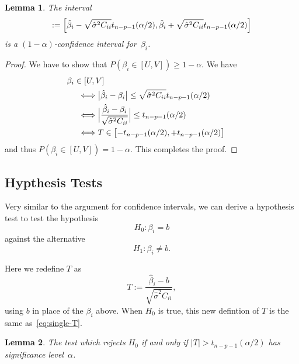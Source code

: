 \documentclass[
  a4paper,
]{article}
\newtheorem{lemma}{Lemma}[section]
\theoremstyle{definition}
\theoremstyle{definition}
\theoremstyle{definition}
\theoremstyle{definition}
\theoremstyle{remark}
\begin{document}
\begin{lemma}
\protect\hypertarget{lem:single-CI}{}\label{lem:single-CI}The interval
\begin{equation*}
  [U, V]
  := \Bigl[ \hat\beta_i - \sqrt{\hat\sigma^2 C_{ii}}t_{n-p-1}(\alpha/2), \hat\beta_i + \sqrt{\hat\sigma^2 C_{ii}}t_{n-p-1}(\alpha/2) \Bigr]
\end{equation*}
is a \((1-\alpha)\)-confidence interval for~\(\beta_i\).
\end{lemma}

\begin{proof}
We have to show that \(P(\beta_i \in [U, V]) \geq 1-\alpha\). We have
\begin{align*}
  &\hskip-5mm \beta_i \in [U, V] \\
  &\Longleftrightarrow
    \bigl| \hat\beta_i - \beta_i \bigr|
        \leq \sqrt{\hat\sigma^2 C_{ii}}t_{n-p-1}(\alpha/2) \\
  &\Longleftrightarrow
    \Bigl| \frac{\hat\beta_i - \beta_i}{\sqrt{\hat\sigma^2 C_{ii}}} \Bigr|
        \leq t_{n-p-1}(\alpha/2) \\
  &\Longleftrightarrow
    T \in \bigl[-t_{n-p-1}(\alpha/2), +t_{n-p-1}(\alpha/2)\bigr]
\end{align*}
and thus \(P(\beta_i \in [U, V]) = 1 - \alpha\). This completes the proof.
\end{proof}

\hypertarget{hypthesis-tests}{%
\subsection{Hypthesis Tests}\label{hypthesis-tests}}

Very similar to the argument for confidence intervals, we can
derive a hypothesis test to test the hypothesis
\begin{equation*}
  H_0\colon \beta_i = b
\end{equation*}
against the alternative
\begin{equation*}
  H_1\colon \beta_i \neq b.
\end{equation*}

Here we redefine \(T\) as
\begin{equation}
  T
  := \frac{\hat\beta_i - b}{\sqrt{\hat\sigma^2 C_{ii}}},  \label{eq:single-test}
\end{equation}
using \(b\) in place of the \(\beta_i\) above. When \(H_0\) is true, this new
defintion of \(T\) is the same as~\eqref{eq:single-T}.

\begin{lemma}
\protect\hypertarget{lem:t-test}{}\label{lem:t-test}The test which rejects \(H_0\) if and only if \(|T| > t_{n-p-1}(\alpha/2)\)
has significance level~\(\alpha\).
\end{lemma}
\end{document}
